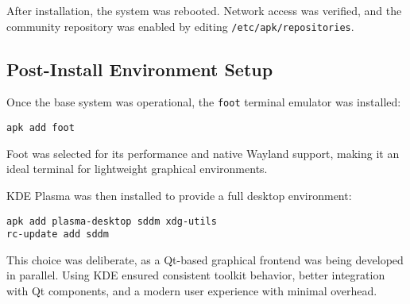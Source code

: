 After installation, the system was rebooted.
Network access was verified, and the community repository was enabled by editing \texttt{/etc/apk/repositories}.

\subsection{Post-Install Environment Setup}
Once the base system was operational, the \texttt{foot} terminal emulator was installed:
\begin{verbatim}
apk add foot
\end{verbatim}
Foot was selected for its performance and native Wayland support,
making it an ideal terminal for lightweight graphical environments.

KDE Plasma was then installed to provide a full desktop environment:
\begin{verbatim}
apk add plasma-desktop sddm xdg-utils
rc-update add sddm
\end{verbatim}
This choice was deliberate, as a Qt-based graphical frontend was being developed in parallel.
Using KDE ensured consistent toolkit behavior, better integration with Qt components, and a modern user experience with minimal overhead.
